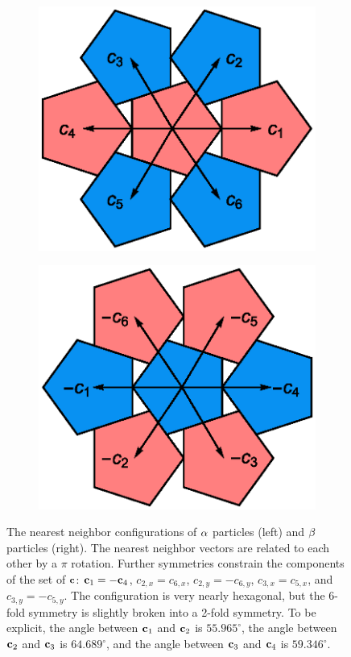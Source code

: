 \documentclass[12pt]{article}
\begin{document}
\begin{figure}
\centering
\begin{subfigure}{0.4\textwidth}
\includegraphics[scale=0.6]{alphabonds.eps}
\end{subfigure}
\begin{subfigure}{0.4\textwidth}
\includegraphics[scale=0.6]{betabonds.eps}
\end{subfigure}
\caption{The nearest neighbor configurations of $\alpha$ particles (left) and $\beta$ particles (right). The nearest neighbor vectors are related to each other by a $\pi$ rotation. Further symmetries constrain the components of the set of $\mathbf{c}$: $\mathbf{c}_1 = -\mathbf{c}_4$, $c_{2,x} = c_{6,x}$, $c_{2,y}=-c_{6,y}$, $c_{3,x} = c_{5,x}$, and $c_{3,y} = -c_{5,y}$. The configuration is very nearly hexagonal, but the 6-fold symmetry is slightly broken into a 2-fold symmetry. To be explicit, the angle between $\mathbf{c}_1$ and $\mathbf{c}_2$ is $55.965^\circ$, the angle between $\mathbf{c}_2$ and $\mathbf{c}_3$ is $64.689^\circ$, and the angle between $\mathbf{c}_3$ and $\mathbf{c}_4$ is $59.346^\circ$.}
\end{figure}
\end{document}
